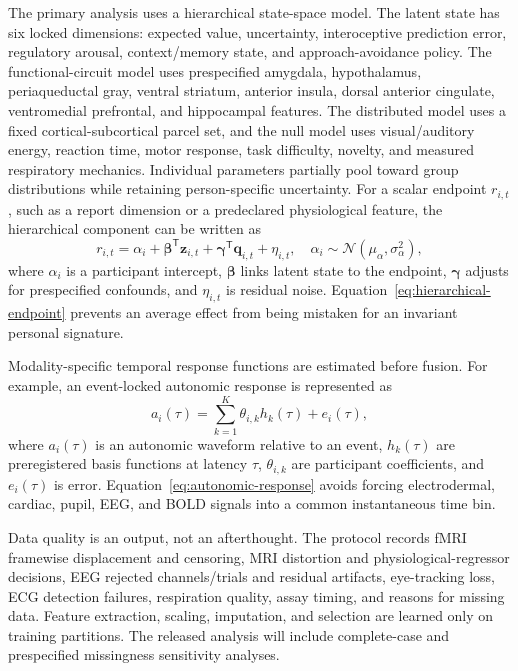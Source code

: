 \documentclass[conference]{IEEEtran}
\begin{document}
The primary analysis uses a hierarchical state-space model. The latent state has six locked dimensions: expected value, uncertainty, interoceptive prediction error, regulatory arousal, context/memory state, and approach-avoidance policy. The functional-circuit model uses prespecified amygdala, hypothalamus, periaqueductal gray, ventral striatum, anterior insula, dorsal anterior cingulate, ventromedial prefrontal, and hippocampal features. The distributed model uses a fixed cortical-subcortical parcel set, and the null model uses visual/auditory energy, reaction time, motor response, task difficulty, novelty, and measured respiratory mechanics. Individual parameters partially pool toward group distributions while retaining person-specific uncertainty. For a scalar endpoint $r_{i,t}$, such as a report dimension or a predeclared physiological feature, the hierarchical component can be written as
\begin{equation}
r_{i,t}=\alpha_i+\boldsymbol{\beta}^{\mathsf{T}}\mathbf{z}_{i,t}+\boldsymbol{\gamma}^{\mathsf{T}}\mathbf{q}_{i,t}+\eta_{i,t},\quad \alpha_i\sim\mathcal{N}(\mu_{\alpha},\sigma_{\alpha}^{2}),
\label{eq:hierarchical-endpoint}
\end{equation}
where $\alpha_i$ is a participant intercept, $\boldsymbol{\beta}$ links latent state to the endpoint, $\boldsymbol{\gamma}$ adjusts for prespecified confounds, and $\eta_{i,t}$ is residual noise. Equation~\eqref{eq:hierarchical-endpoint} prevents an average effect from being mistaken for an invariant personal signature.

Modality-specific temporal response functions are estimated before fusion. For example, an event-locked autonomic response is represented as
\begin{equation}
a_{i}(\tau)=\sum_{k=1}^{K}\theta_{i,k}h_k(\tau)+e_i(\tau),
\label{eq:autonomic-response}
\end{equation}
where $a_i(\tau)$ is an autonomic waveform relative to an event, $h_k(\tau)$ are preregistered basis functions at latency $\tau$, $\theta_{i,k}$ are participant coefficients, and $e_i(\tau)$ is error. Equation~\eqref{eq:autonomic-response} avoids forcing electrodermal, cardiac, pupil, EEG, and BOLD signals into a common instantaneous time bin.

Data quality is an output, not an afterthought. The protocol records fMRI framewise displacement and censoring, MRI distortion and physiological-regressor decisions, EEG rejected channels/trials and residual artifacts, eye-tracking loss, ECG detection failures, respiration quality, assay timing, and reasons for missing data. Feature extraction, scaling, imputation, and selection are learned only on training partitions. The released analysis will include complete-case and prespecified missingness sensitivity analyses.
\end{document}
